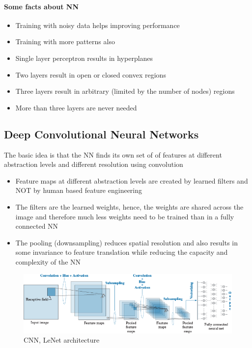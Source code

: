 \paragraph{Some facts about NN}
\begin{itemize}
\item Training with noisy data helps improving performance
\item Training with more patterns also
\item Single layer perceptron results in hyperplanes
\item Two layers result in open or closed convex regions
\item Three layers result in arbitrary (limited by the number of nodes) regions
\item More than three layers are never needed
\end{itemize}


\subsection{Deep Convolutional Neural Networks}
The basic idea is that the NN finds its own set of of features at different abstraction levels and different resolution using convolution
\begin{itemize}
  \item Feature maps at different abstraction levels are created by learned filters and NOT by human based feature engineering
  \item The filters are the learned weights, hence, the weights are shared across the image and therefore much less weights need to be trained than in a fully connected NN
  \item The pooling (downsampling) reduces spatial resolution and also results in some invariance to feature translation while reducing the capacity and complexity of the NN
\end{itemize}
\begin{figure}[htp]
  \centering
  \includegraphics[width=\linewidth]{images/cnn.png}
  \caption{CNN, LeNet architecture}
  \label{fig:cnn}
\end{figure}

